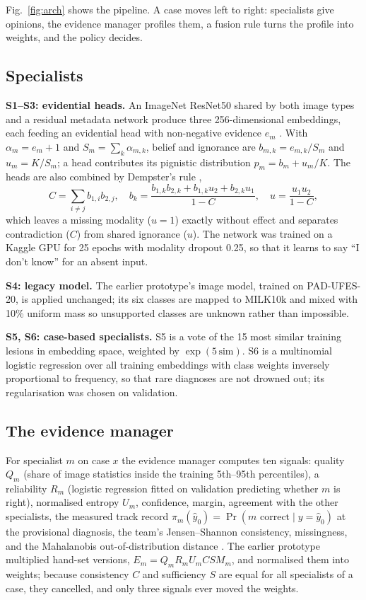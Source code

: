 \documentclass[conference]{IEEEtran}
\begin{document}
Fig.~\ref{fig:arch} shows the pipeline. A case moves left to right: specialists give
opinions, the evidence manager profiles them, a fusion rule turns the profile into
weights, and the policy decides.

\subsection{Specialists}

\textbf{S1--S3: evidential heads.} An ImageNet ResNet50 \cite{he2016resnet} shared by both
image types and a residual metadata network produce three 256-dimensional embeddings, each
feeding an evidential head with non-negative evidence $e_m$ \cite{sensoy2018edl}. With
$\alpha_m=e_m+1$ and $S_m=\sum_k\alpha_{m,k}$, belief and ignorance are $b_{m,k}=e_{m,k}/S_m$
and $u_m=K/S_m$; a head contributes its pignistic distribution $p_m=b_m+u_m/K$. The heads are
also combined by Dempster's rule \cite{han2021tmc},
\begin{equation}
C=\textstyle\sum_{i\neq j}b_{1,i}b_{2,j},\quad
b_k=\frac{b_{1,k}b_{2,k}+b_{1,k}u_2+b_{2,k}u_1}{1-C},\quad u=\frac{u_1u_2}{1-C},
\end{equation}
which leaves a missing modality ($u=1$) exactly without effect and separates
contradiction ($C$) from shared ignorance ($u$). The network was trained on a Kaggle GPU
for 25 epochs with modality dropout 0.25, so that it learns to say ``I don't know'' for an
absent input.

\textbf{S4: legacy model.} The earlier prototype's image model, trained on PAD-UFES-20, is
applied unchanged; its six classes are mapped to MILK10k and mixed with 10\% uniform mass
so unsupported classes are unknown rather than impossible.

\textbf{S5, S6: case-based specialists.} S5 is a vote of the 15 most similar training
lesions in embedding space, weighted by $\exp(5\,\mathrm{sim})$. S6 is a
multinomial logistic regression over all training embeddings with class weights inversely
proportional to frequency, so that rare diagnoses are not drowned out; its regularisation
was chosen on validation.

\subsection{The evidence manager}

For specialist $m$ on case $x$ the evidence manager computes ten signals: quality $Q_m$
(share of image statistics inside the training 5th--95th percentiles), a reliability
$R_m$ (logistic regression fitted on validation predicting whether $m$ is right),
normalised entropy $U_m$, confidence, margin, agreement with the other specialists, the
measured track record $\pi_m(\hat y_0)=\Pr(m\text{ correct}\mid y=\hat y_0)$ at the
provisional diagnosis, the team's Jensen--Shannon consistency,
missingness, and the Mahalanobis out-of-distribution distance
\cite{lee2018mahalanobis}. The earlier prototype multiplied hand-set versions,
$E_m=Q_mR_mU_mCSM_m$, and normalised them into weights; because consistency $C$ and
sufficiency $S$ are equal for all specialists of a case, they cancelled, and only three
signals ever moved the weights.
\end{document}
